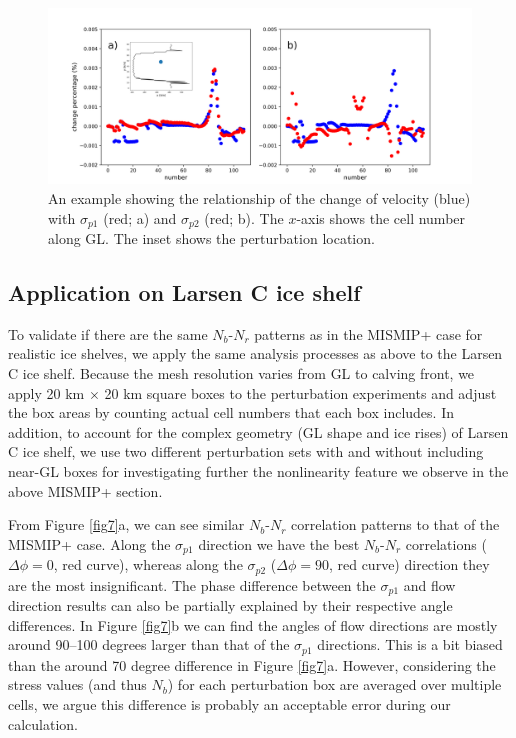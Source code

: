 \documentclass[review,oneside]{igs}
\begin{document}
\begin{figure}
	\centering
    \includegraphics[width=1\linewidth]{figs/fig6_new.pdf}
    \caption{An example showing the relationship of the change of velocity (blue) with $\sigma_{p1}$ (red; a) and $\sigma_{p2}$ (red; b). The $x$-axis shows the cell number along GL. The inset shows the perturbation location.}
	\label{fig6}
\end{figure}

\subsection{Application on Larsen C ice shelf}

To validate if there are the same $N_b$-$N_r$ patterns as in the MISMIP+ case for realistic ice shelves, we apply the same analysis processes as above to the Larsen C ice shelf. Because the mesh resolution varies from GL to calving front, we apply 20 km $\times$ 20 km square boxes to the perturbation experiments and adjust the box areas by counting actual cell numbers that each box includes. In addition, to account for the complex geometry (GL shape and ice rises) of Larsen C ice shelf, we use two different perturbation sets with and without including near-GL boxes for investigating further the nonlinearity feature we observe in the above MISMIP+ section. 

From Figure \ref{fig7}a, we can see similar $N_b$-$N_r$ correlation patterns to that of the MISMIP+ case. Along the $\sigma_{p1}$ direction we have the best $N_b$-$N_r$ correlations ($\Delta\phi=0$, red curve), whereas along the $\sigma_{p2}$ ($\Delta\phi=90$, red curve) direction they are the most insignificant. The phase difference between the $\sigma_{p1}$ and flow direction results can also be partially explained by their respective angle differences. In Figure \ref{fig7}b we can find the angles of flow directions are mostly around 90--100 degrees larger than that of the $\sigma_{p1}$ directions. This is a bit biased than the around 70 degree difference in Figure \ref{fig7}a. However, considering the stress values (and thus $N_b$) for each perturbation box are averaged over multiple cells, we argue this difference is probably an acceptable error during our calculation.  
\end{document}
